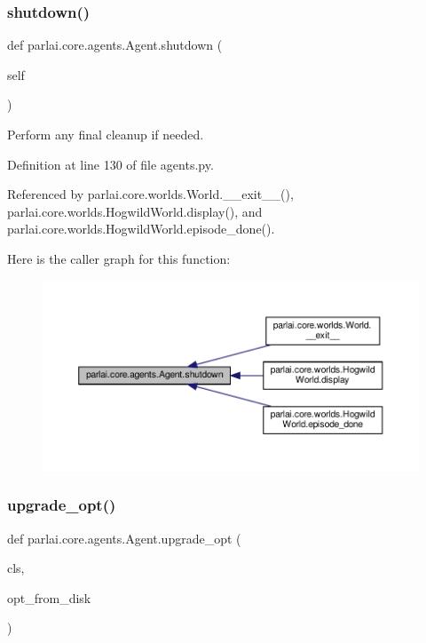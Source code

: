 \subsubsection{\texorpdfstring{shutdown()}{shutdown()}}
{\footnotesize\ttfamily def parlai.\+core.\+agents.\+Agent.\+shutdown (\begin{DoxyParamCaption}\item[{}]{self }\end{DoxyParamCaption})}

\begin{DoxyVerb}Perform any final cleanup if needed.\end{DoxyVerb}
 

Definition at line 130 of file agents.\+py.



Referenced by parlai.\+core.\+worlds.\+World.\+\_\+\+\_\+exit\+\_\+\+\_\+(), parlai.\+core.\+worlds.\+Hogwild\+World.\+display(), and parlai.\+core.\+worlds.\+Hogwild\+World.\+episode\+\_\+done().

Here is the caller graph for this function\+:
\nopagebreak
\begin{figure}[H]
\begin{center}
\leavevmode
\includegraphics[width=350pt]{classparlai_1_1core_1_1agents_1_1Agent_a801e5ca2a5e8e96a72f0c04549008e8f_icgraph}
\end{center}
\end{figure}
\mbox{\label{classparlai_1_1core_1_1agents_1_1Agent_a005f62f977e8a7ebf91b9646307153bc}} 
\subsubsection{\texorpdfstring{upgrade\+\_\+opt()}{upgrade\_opt()}}
{\footnotesize\ttfamily def parlai.\+core.\+agents.\+Agent.\+upgrade\+\_\+opt (\begin{DoxyParamCaption}\item[{}]{cls,  }\item[{}]{opt\+\_\+from\+\_\+disk }\end{DoxyParamCaption})}

